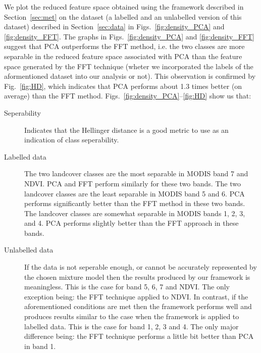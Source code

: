 \documentclass{article}
\begin{document}
We plot the reduced feature space obtained using the framework described in Section~\ref{sec:met} on the dataset (a labelled and an unlabelled version of this dataset) described in Section~\ref{sec:data} in Figs.~\ref{fig:density_PCA} and \ref{fig:density_FFT}. The graphs in Figs.~\ref{fig:density_PCA} and \ref{fig:density_FFT} suggest that PCA outperforms the FFT method, i.e. the two 
classes are more separable in the reduced feature space associated with PCA than the feature space generated by the FFT technique (wheter we incorporated the labels of the aformentioned dataset into our analysis or not). This observation is confirmed 
by Fig.~\ref{fig:HD}, which indicates that PCA performs about 1.3 times better (on average) than the FFT method. Figs.~\ref{fig:density_PCA}--\ref{fig:HD} show us that:
\begin{description}
 \item[Seperability] Indicates that the Hellinger distance is a good metric to use as an indication of class seperability.
 \item[Labelled data] The two landcover classes are the most separable in MODIS band 7 and NDVI. PCA and FFT perform similarly for these two bands. The two landcover classes are the least separable in MODIS band 5 and 6. PCA performs significantly better than the FFT method in these two bands.
 The landcover classes are somewhat separable in MODIS bands 1, 2, 3, and 4. PCA performs slightly better than the FFT approach in these bands. 
 \item[Unlabelled data]  
 If the data is not seperable enough, or cannot be accurately represented by the chosen mixture model then the results produced by our framework is meaningless. This is the case for band 5, 6, 7 and NDVI. The only 
 exception being: the FFT technique applied to NDVI. In contrast, if the aforementioned conditions are met then the framework performs well and produces results similar to the case when the framework is applied to labelled data. This is the case for band
 1, 2, 3 and 4. The only major difference being: the FFT technique performs a little bit better than PCA in band 1.
\end{description}
\end{document}
